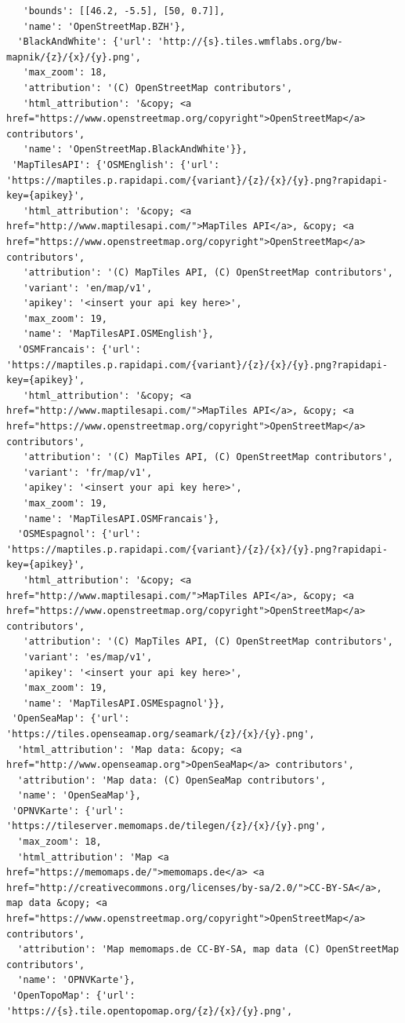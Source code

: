 \documentclass[
  letterpaper,
  DIV=11,
  numbers=noendperiod]{scrreprt}
\begin{document}
\begin{verbatim}
   'bounds': [[46.2, -5.5], [50, 0.7]],
   'name': 'OpenStreetMap.BZH'},
  'BlackAndWhite': {'url': 'http://{s}.tiles.wmflabs.org/bw-mapnik/{z}/{x}/{y}.png',
   'max_zoom': 18,
   'attribution': '(C) OpenStreetMap contributors',
   'html_attribution': '&copy; <a href="https://www.openstreetmap.org/copyright">OpenStreetMap</a> contributors',
   'name': 'OpenStreetMap.BlackAndWhite'}},
 'MapTilesAPI': {'OSMEnglish': {'url': 'https://maptiles.p.rapidapi.com/{variant}/{z}/{x}/{y}.png?rapidapi-key={apikey}',
   'html_attribution': '&copy; <a href="http://www.maptilesapi.com/">MapTiles API</a>, &copy; <a href="https://www.openstreetmap.org/copyright">OpenStreetMap</a> contributors',
   'attribution': '(C) MapTiles API, (C) OpenStreetMap contributors',
   'variant': 'en/map/v1',
   'apikey': '<insert your api key here>',
   'max_zoom': 19,
   'name': 'MapTilesAPI.OSMEnglish'},
  'OSMFrancais': {'url': 'https://maptiles.p.rapidapi.com/{variant}/{z}/{x}/{y}.png?rapidapi-key={apikey}',
   'html_attribution': '&copy; <a href="http://www.maptilesapi.com/">MapTiles API</a>, &copy; <a href="https://www.openstreetmap.org/copyright">OpenStreetMap</a> contributors',
   'attribution': '(C) MapTiles API, (C) OpenStreetMap contributors',
   'variant': 'fr/map/v1',
   'apikey': '<insert your api key here>',
   'max_zoom': 19,
   'name': 'MapTilesAPI.OSMFrancais'},
  'OSMEspagnol': {'url': 'https://maptiles.p.rapidapi.com/{variant}/{z}/{x}/{y}.png?rapidapi-key={apikey}',
   'html_attribution': '&copy; <a href="http://www.maptilesapi.com/">MapTiles API</a>, &copy; <a href="https://www.openstreetmap.org/copyright">OpenStreetMap</a> contributors',
   'attribution': '(C) MapTiles API, (C) OpenStreetMap contributors',
   'variant': 'es/map/v1',
   'apikey': '<insert your api key here>',
   'max_zoom': 19,
   'name': 'MapTilesAPI.OSMEspagnol'}},
 'OpenSeaMap': {'url': 'https://tiles.openseamap.org/seamark/{z}/{x}/{y}.png',
  'html_attribution': 'Map data: &copy; <a href="http://www.openseamap.org">OpenSeaMap</a> contributors',
  'attribution': 'Map data: (C) OpenSeaMap contributors',
  'name': 'OpenSeaMap'},
 'OPNVKarte': {'url': 'https://tileserver.memomaps.de/tilegen/{z}/{x}/{y}.png',
  'max_zoom': 18,
  'html_attribution': 'Map <a href="https://memomaps.de/">memomaps.de</a> <a href="http://creativecommons.org/licenses/by-sa/2.0/">CC-BY-SA</a>, map data &copy; <a href="https://www.openstreetmap.org/copyright">OpenStreetMap</a> contributors',
  'attribution': 'Map memomaps.de CC-BY-SA, map data (C) OpenStreetMap contributors',
  'name': 'OPNVKarte'},
 'OpenTopoMap': {'url': 'https://{s}.tile.opentopomap.org/{z}/{x}/{y}.png',

\end{verbatim}
\end{document}
